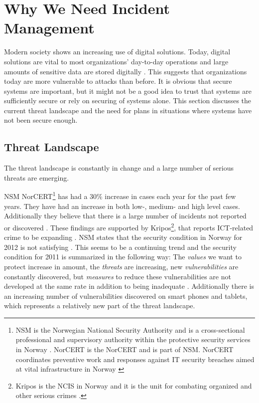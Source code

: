 \section{Why We Need Incident Management}
Modern society shows an increasing use of digital solutions. Today, digital solutions are vital to most organizations' day-to-day operations and large amounts of sensitive data are stored digitally \cite{KriposTrender}. This suggests that organizations today are more vulnerable to attacks than before. It is obvious that secure systems are important, but it might not be a good idea to trust that systems are sufficiently secure or rely on securing of systems alone.  This section discusses the current threat landscape and the need for plans in situations where systems have not been secure enough.

\subsection{Threat Landscape}
The threat landscape is constantly in change and a large number of serious threats are emerging.

\acs{NSM} \acs{NorCERT}\footnote{\acs{NSM} is the Norwegian National Security Authority and is a cross-sectional professional and supervisory authority within the protective security services in Norway \cite{AboutNSM}. \acs{NorCERT} is the \acl{NorCERT} and is part of \acs{NSM}. \acs{NorCERT} coordinates preventive work and responses against IT security breaches aimed at vital infrastructure in Norway \cite{AboutNorCERT}} has had a 30\% increase in cases each year for the past few years. They have had an increase in both low-, medium- and high level cases. Additionally they believe that there is a large number of incidents not reported or discovered \cite{NorCERT3Kvartal2012}. These findings are supported by Kripos\footnote{Kripos is the \ac{NCIS} in Norway and it is the unit for combating organized and other serious crimes \cite{policeInNorway}.}, that reports ICT-related crime to be expanding \cite{KriposTrender}. \acs{NSM} states that the security condition in Norway for 2012 is not satisfying \cite{samordnaVurdering}. This seems to be a continuing trend and the security condition for 2011 is summarized in the following way: The \textit{values} we want to protect increase in amount, the \textit{threats} are increasing, new \textit{vulnerabilities} are constantly discovered, but \textit{measures} to reduce these vulnerabilities are not developed at the same rate in addition to being inadequate \cite{NSMRapport}. Additionally there is an increasing number of vulnerabilities discovered on smart phones and tablets, which represents a relatively new part of the threat landscape.

